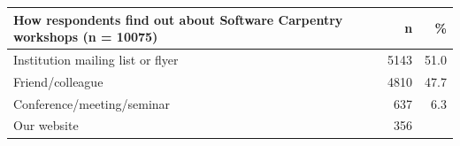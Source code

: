 \documentclass[]{article}
\begin{document}
\begin{longtable}[]{@{}lrr@{}}
\toprule
\begin{minipage}[b]{0.78\columnwidth}\raggedright\strut
How respondents find out about Software Carpentry workshops (n =
10075)\strut
\end{minipage} & \begin{minipage}[b]{0.06\columnwidth}\raggedleft\strut
n\strut
\end{minipage} & \begin{minipage}[b]{0.06\columnwidth}\raggedleft\strut
\%\strut
\end{minipage}\tabularnewline
\midrule
\endhead
\begin{minipage}[t]{0.78\columnwidth}\raggedright\strut
Institution mailing list or flyer\strut
\end{minipage} & \begin{minipage}[t]{0.06\columnwidth}\raggedleft\strut
5143\strut
\end{minipage} & \begin{minipage}[t]{0.06\columnwidth}\raggedleft\strut
51.0\strut
\end{minipage}\tabularnewline
\begin{minipage}[t]{0.78\columnwidth}\raggedright\strut
Friend/colleague\strut
\end{minipage} & \begin{minipage}[t]{0.06\columnwidth}\raggedleft\strut
4810\strut
\end{minipage} & \begin{minipage}[t]{0.06\columnwidth}\raggedleft\strut
47.7\strut
\end{minipage}\tabularnewline
\begin{minipage}[t]{0.78\columnwidth}\raggedright\strut
Conference/meeting/seminar\strut
\end{minipage} & \begin{minipage}[t]{0.06\columnwidth}\raggedleft\strut
637\strut
\end{minipage} & \begin{minipage}[t]{0.06\columnwidth}\raggedleft\strut
6.3\strut
\end{minipage}\tabularnewline
\begin{minipage}[t]{0.78\columnwidth}\raggedright\strut
Our website\strut
\end{minipage} & \begin{minipage}[t]{0.06\columnwidth}\raggedleft\strut
356\strut
\end{minipage} & \begin{minipage}[t]{0.06\columnwidth}\raggedleft\strut

\end{minipage}
\end{longtable}
\end{document}
